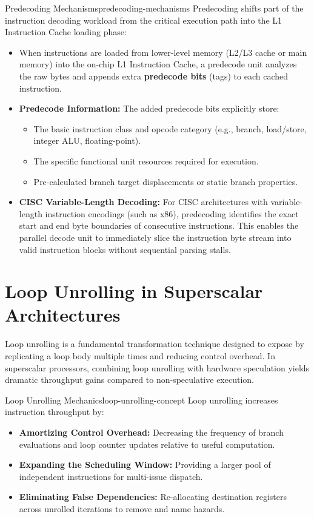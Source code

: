 \begin{observation}{Predecoding Mechanisms}{predecoding-mechanisms}
Predecoding shifts part of the instruction decoding workload from the critical execution path into the L1 Instruction Cache loading phase:
\begin{itemize}
    \item When instructions are loaded from lower-level memory (L2/L3 cache or main memory) into the on-chip L1 Instruction Cache, a predecode unit analyzes the raw bytes and appends extra \textbf{predecode bits} (tags) to each cached instruction.
    \item \textbf{Predecode Information:} The added predecode bits explicitly store:
    \begin{itemize}
        \item The basic instruction class and opcode category (e.g., branch, load/store, integer ALU, floating-point).
        \item The specific functional unit resources required for execution.
        \item Pre-calculated branch target displacements or static branch properties.
    \end{itemize}
    \item \textbf{CISC Variable-Length Decoding:} For CISC architectures with variable-length instruction encodings (such as x86), predecoding identifies the exact start and end byte boundaries of consecutive instructions. This enables the parallel decode unit to immediately slice the instruction byte stream into valid instruction blocks without sequential parsing stalls.
\end{itemize}
\end{observation}

\section{Loop Unrolling in Superscalar Architectures}
\label{sec:loop_unrolling_superscalar}

Loop unrolling is a fundamental transformation technique designed to expose  by replicating a loop body multiple times and reducing control overhead. In superscalar processors, combining loop unrolling with hardware speculation yields dramatic throughput gains compared to non-speculative execution.

\begin{concept}{Loop Unrolling Mechanics}{loop-unrolling-concept}
Loop unrolling increases instruction throughput by:
\begin{itemize}
    \item \textbf{Amortizing Control Overhead:} Decreasing the frequency of branch evaluations and loop counter updates relative to useful computation.
    \item \textbf{Expanding the Scheduling Window:} Providing a larger pool of independent instructions for multi-issue dispatch.
    \item \textbf{Eliminating False Dependencies:} Re-allocating destination registers across unrolled iterations to remove  and  name hazards.
\end{itemize}
\end{concept}

